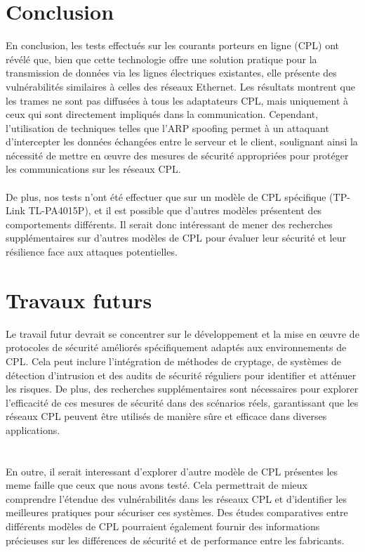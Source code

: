 \documentclass[a4paper,twocolumn]{report}
\begin{document}
\section{Conclusion} En conclusion, les tests effectués sur les courants porteurs en ligne (CPL) ont révélé que, bien que cette technologie offre une solution pratique pour la transmission de données via les lignes électriques existantes, elle présente des vulnérabilités similaires à celles des réseaux Ethernet. Les résultats montrent que les trames ne sont pas diffusées à tous les adaptateurs CPL, mais uniquement à ceux qui sont directement impliqués dans la communication. Cependant, l'utilisation de techniques telles que l'ARP spoofing permet à un attaquant d'intercepter les données échangées entre le serveur et le client, soulignant ainsi la nécessité de mettre en œuvre des mesures de sécurité appropriées pour protéger les communications sur les réseaux CPL.
\paragraph{}De plus, nos tests n'ont été effectuer que sur un modèle de CPL spécifique (TP-Link TL-PA4015P), et il est possible que d'autres modèles présentent des comportements différents. Il serait donc intéressant de mener des recherches supplémentaires sur d'autres modèles de CPL pour évaluer leur sécurité et leur résilience face aux attaques potentielles.

\section{Travaux futurs}
Le travail futur devrait se concentrer sur le développement et la mise en œuvre de protocoles de sécurité améliorés spécifiquement adaptés aux environnements de CPL. Cela peut inclure l'intégration de méthodes de cryptage, de systèmes de détection d'intrusion et des audits de sécurité réguliers pour identifier et atténuer les risques. De plus, des recherches supplémentaires sont nécessaires pour explorer l'efficacité de ces mesures de sécurité dans des scénarios réels, garantissant que les réseaux CPL peuvent être utilisés de manière sûre et efficace dans diverses applications.
\section{}En outre, il serait interessant d'explorer d'autre modèle de CPL présentes les meme faille que ceux que nous avons testé. Cela permettrait de mieux comprendre l'étendue des vulnérabilités dans les réseaux CPL et d'identifier les meilleures pratiques pour sécuriser ces systèmes. Des études comparatives entre différents modèles de CPL pourraient également fournir des informations précieuses sur les différences de sécurité et de performance entre les fabricants.
\end{document}

